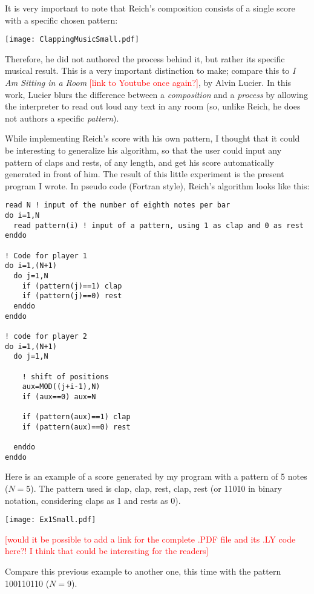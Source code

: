 \documentclass{article}
\begin{document}
It is very important to note that Reich's composition consists of a single score with a specific chosen pattern:

\texttt{[image: ClappingMusicSmall.pdf]}

Therefore, he did not authored the process behind it, but rather its specific musical result. 
This is a very important distinction to make; compare this to \textit{I Am Sitting in a Room}
\textcolor{red}{[link to Youtube once again?]}, by Alvin Lucier. 
In this work, Lucier blurs the difference between a \textit{composition} and a \textit{process} by allowing
the interpreter to read out loud any text in any room (so, unlike Reich, he does not authors a specific
\textit{pattern}). 

While implementing Reich's score with his own pattern, I thought that it could be interesting to generalize
his algorithm, so that the user could input any pattern of claps and rests, of any length, and get his score
automatically generated in front of him. 
The result of this little experiment is the present program I wrote. 
In pseudo code (Fortran style), Reich's algorithm looks like this:

\begin{verbatim}
read N ! input of the number of eighth notes per bar
do i=1,N
  read pattern(i) ! input of a pattern, using 1 as clap and 0 as rest
enddo

! Code for player 1
do i=1,(N+1)
  do j=1,N
    if (pattern(j)==1) clap
    if (pattern(j)==0) rest
  enddo
enddo

! code for player 2
do i=1,(N+1)
  do j=1,N

    ! shift of positions
    aux=MOD((j+i-1),N)
    if (aux==0) aux=N

    if (pattern(aux)==1) clap
    if (pattern(aux)==0) rest

  enddo
enddo
\end{verbatim}

Here is an example of a score generated by my program with a pattern of 5 notes ($N=5$). 
The pattern used is clap, clap, rest, clap, rest (or 11010 in binary notation, considering claps as 1 and rests
as 0).

\texttt{[image: Ex1Small.pdf]}

\textcolor{red}{[would it be possible to add a link for the complete .PDF file and its .LY code here?!
I think that could be interesting for the readers]}

Compare this previous example to another one, this time with the pattern 100110110 ($N=9$).
\end{document}
